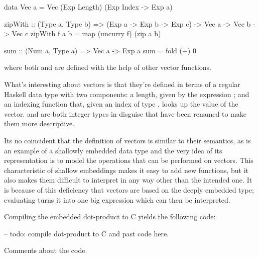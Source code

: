 \documentclass[../main.tex]{subfiles}
\begin{document}
\begin{code}
data Vec a = Vec (Exp Length) (Exp Index -> Exp a)

zipWith :: (Type a, Type b)
  => (Exp a -> Exp b -> Exp c)
  ->  Vec a -> Vec b -> Vec c
zipWith f a b = map (uncurry f) (zip a b)

sum :: (Num a, Type a) => Vec a -> Exp a
sum = fold (+) 0
\end{code}

\noindent where both  and  are defined with the help of other vector functions.

What's interesting about vectors is that they're defined in terms of a regular Haskell data type with two components: a length, given by the expression ; and an indexing function  that, given an index of type , looks up the value  of the vector.  and  are both integer types in disguise that have been renamed to make them more descriptive.

Its no coincident that the definition of vectors is similar to their semantics, as  is an example of a shallowly embedded data type and the very idea of its representation is to model the operations that can be performed on vectors. This characteristic of shallow embeddings makes it easy to add new functions, but it also makes them difficult to interpret in any way other than the intended one. It is because of this deficiency that vectors are based on the deeply embedded  type; evaluating  turns it into one big expression which can then be interpreted.

Compiling the embedded dot-product to C yields the following code:

\begin{code}
-- todo: compile dot-product to C and past code here.
\end{code}

Comments about the code.
\end{document}
